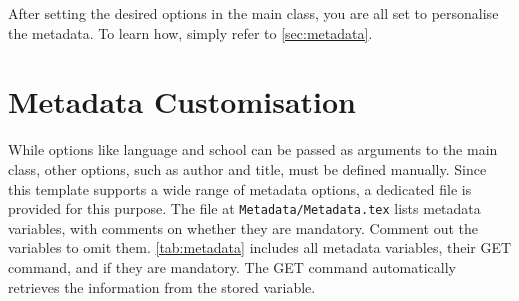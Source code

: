 After setting the desired options in the main class, you are all set to personalise the metadata. To learn how, simply refer to \autoref{sec:metadata}.

\section{Metadata Customisation}
\label{sec:metadata}
While options like language and school can be passed as arguments to the main class, other options, such as author and title, must be defined manually. Since this template supports a wide range of metadata options, a dedicated file is provided for this purpose. The file at \texttt{Metadata/Metadata.tex} lists metadata variables, with comments on whether they are mandatory. Comment out the variables to omit them. \autoref{tab:metadata} includes all metadata variables, their GET command, and if they are mandatory. The GET command automatically retrieves the information from the stored variable.

